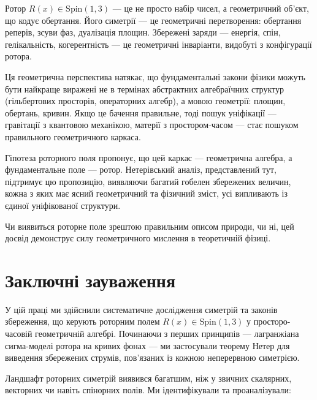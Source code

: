 \documentclass[11pt,a4paper]{article}
\numberwithin{equation}{section}
\theoremstyle{plain}
\theoremstyle{definition}
\theoremstyle{remark}
\begin{document}
Ротор $R(x) \in \mathrm{Spin}(1,3)$ — це не просто набір чисел, а геометричний об'єкт, що кодує обертання. Його симетрії — це геометричні перетворення: обертання реперів, зсуви фаз, дуалізація площин. Збережені заряди — енергія, спін, гелікальність, когерентність — це геометричні інваріанти, видобуті з конфігурації ротора.

Ця геометрична перспектива натякає, що фундаментальні закони фізики можуть бути найкраще виражені не в термінах абстрактних алгебраїчних структур (гільбертових просторів, операторних алгебр), а мовою геометрії: площин, обертань, кривин. Якщо це бачення правильне, тоді пошук уніфікації — гравітації з квантовою механікою, матерії з простором-часом — стає пошуком правильного геометричного каркаса.

Гіпотеза роторного поля пропонує, що цей каркас — геометрична алгебра, а фундаментальне поле — ротор. Нетерівський аналіз, представлений тут, підтримує цю пропозицію, виявляючи багатий гобелен збережених величин, кожна з яких має ясний геометричний та фізичний зміст, усі випливають із єдиної уніфікованої структури.

Чи виявиться роторне поле зрештою правильним описом природи, чи ні, цей досвід демонструє силу геометричного мислення в теоретичній фізиці.

\section{Заключні зауваження}
\label{sec:conclusion}

У цій праці ми здійснили систематичне дослідження симетрій та законів збереження, що керують роторним полем $R(x) \in \mathrm{Spin}(1,3)$ у просторо-часовій геометричній алгебрі. Починаючи з перших принципів — лагранжіана сигма-моделі ротора на кривих фонах — ми застосували теорему Нетер для виведення збережених струмів, пов'язаних із кожною неперервною симетрією.

Ландшафт роторних симетрій виявився багатшим, ніж у звичних скалярних, векторних чи навіть спінорних полів. Ми ідентифікували та проаналізували:
\end{document}
